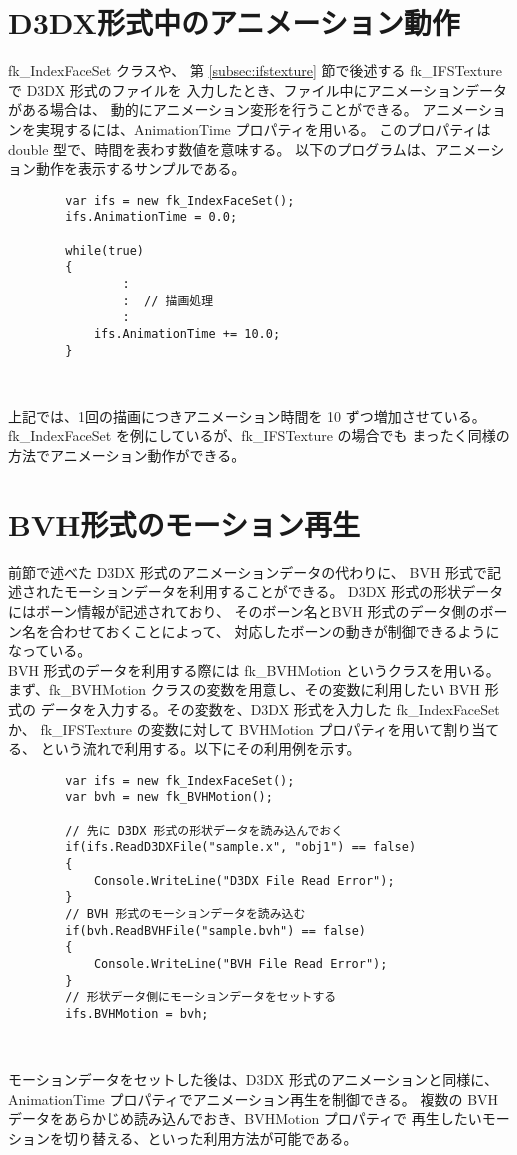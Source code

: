 \section{D3DX形式中のアニメーション動作} \label{sec:d3dxanimation}
fk\_IndexFaceSet クラスや、
第 \ref{subsec:ifstexture} 節で後述する
fk\_IFSTexture で D3DX 形式のファイルを
入力したとき、ファイル中にアニメーションデータがある場合は、
動的にアニメーション変形を行うことができる。
アニメーションを実現するには、AnimationTime プロパティを用いる。
このプロパティは double 型で、時間を表わす数値を意味する。
以下のプログラムは、アニメーション動作を表示するサンプルである。
\\
\begin{breakbox}
\begin{verbatim}
        var ifs = new fk_IndexFaceSet();
        ifs.AnimationTime = 0.0;
        
        while(true)
        {
                :
                :  // 描画処理
                :
            ifs.AnimationTime += 10.0;
        }
\end{verbatim}
\end{breakbox} ~

上記では、1回の描画につきアニメーション時間を 10 ずつ増加させている。
fk\_IndexFaceSet を例にしているが、fk\_IFSTexture の場合でも
まったく同様の方法でアニメーション動作ができる。

\section{BVH形式のモーション再生} \label{sec:bvhmotion}
前節で述べた D3DX 形式のアニメーションデータの代わりに、
BVH 形式で記述されたモーションデータを利用することができる。
D3DX 形式の形状データにはボーン情報が記述されており、
そのボーン名とBVH 形式のデータ側のボーン名を合わせておくことによって、
対応したボーンの動きが制御できるようになっている。
\\
BVH 形式のデータを利用する際には fk\_BVHMotion というクラスを用いる。
まず、fk\_BVHMotion クラスの変数を用意し、その変数に利用したい BVH 形式の
データを入力する。その変数を、D3DX 形式を入力した fk\_IndexFaceSet か、
fk\_IFSTexture の変数に対して BVHMotion プロパティを用いて割り当てる、
という流れで利用する。以下にその利用例を示す。
\\
\begin{breakbox}
\begin{verbatim}
        var ifs = new fk_IndexFaceSet();
        var bvh = new fk_BVHMotion();
        
        // 先に D3DX 形式の形状データを読み込んでおく
        if(ifs.ReadD3DXFile("sample.x", "obj1") == false)
        {
            Console.WriteLine("D3DX File Read Error");
        }
        // BVH 形式のモーションデータを読み込む
        if(bvh.ReadBVHFile("sample.bvh") == false)
        {
            Console.WriteLine("BVH File Read Error");
        }
        // 形状データ側にモーションデータをセットする
        ifs.BVHMotion = bvh;
\end{verbatim}
\end{breakbox} ~

モーションデータをセットした後は、D3DX 形式のアニメーションと同様に、
AnimationTime プロパティでアニメーション再生を制御できる。
複数の BVH データをあらかじめ読み込んでおき、BVHMotion プロパティで
再生したいモーションを切り替える、といった利用方法が可能である。
